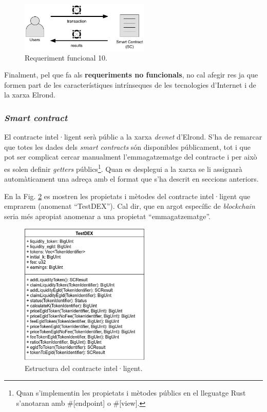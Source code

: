\documentclass[11pt,a4paper]{article}
\begin{document}
\begin{figure}[h]
\includegraphics[width=0.55\textwidth]{cu_trans_results.png}
\centering
\caption{Requeriment funcional 10.}\label{fig:transresults}
\end{figure} 

Finalment, pel que fa als \textbf{requeriments no funcionals}, no cal afegir res ja que formen part de les característiques intrínseques de les tecnologies d'Internet i de la xarxa Elrond.

\subsubsection{\textit{Smart contract}}
El contracte intel·ligent serà públic a la xarxa \textit{devnet} d'Elrond. S'ha de remarcar que totes les dades dels \textit{smart contracts} són disponibles públicament, tot i que pot ser complicat cercar manualment l'emmagatzematge del contracte i per això es solen definir \textit{getters} públics\footnote{Quan s'implementin les propietats i mètodes públics en el lleguatge Rust s'anotaran amb \#[endpoint] o \#[view].}. Quan es desplegui a la xarxa se li assignarà automàticament una adreça amb el format que s'ha descrit en seccions anteriors.

En la Fig. \ref{fig:testdex} es mostren les propietats i mètodes del contracte intel·ligent que emprarem (anomenat ``TestDEX''). Cal dir, que en argot específic de \textit{blockchain} seria més apropiat anomenar a una propietat ``emmagatzematge''. 

\begin{figure}[h]
\includegraphics[width=0.55\textwidth]{TestDEX.png}
\centering
\caption{Estructura del contracte intel·ligent.}\label{fig:testdex}
\end{figure} 
\end{document}
